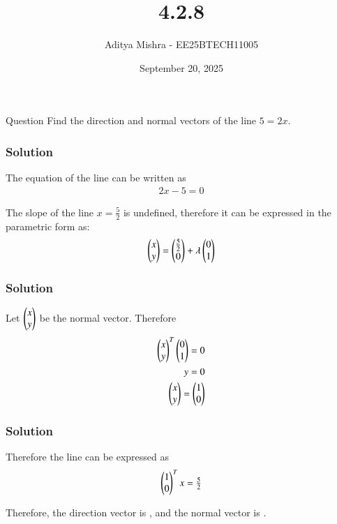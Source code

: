 \documentclass{beamer}
\title
{4.2.8}
\date{September 20, 2025}
\author
{Aditya Mishra - EE25BTECH11005}
\begin{document}
\frame{\titlepage}

\begin{frame}{Question}
Find the direction and normal vectors of the line $5 = 2x$.
\end{frame}

\begin{frame}[fragile]
    \frametitle{Solution}
The equation of the line can be written as
\begin{align}
2x - 5 = 0
\end{align}

The slope of the line $x = \frac{5}{2}$ is undefined, therefore it can be expressed in the parametric form as:
\begin{align}
\begin{pmatrix}x\\y\end{pmatrix} = \begin{pmatrix}\tfrac{5}{2}\\0\end{pmatrix} + \lambda\begin{pmatrix}0\\1\end{pmatrix}
\end{align}
\end{frame}

\begin{frame}[fragile]
    \frametitle{Solution}
Let $\begin{pmatrix}x\\y\end{pmatrix}$ be the normal vector. Therefore
\begin{align}
\begin{pmatrix}x\\ y\end{pmatrix}^T\begin{pmatrix}0\\1\end{pmatrix} = 0 \\
y = 0\\
\begin{pmatrix}x\\y\end{pmatrix} = \begin{pmatrix}1\\0\end{pmatrix}
\end{align}
\end{frame}

\begin{frame}[fragile]
    \frametitle{Solution}
Therefore the line can be expressed as
\begin{align}
\begin{pmatrix}1\\0\end{pmatrix}^Tx = \tfrac{5}{2}
\end{align}

\vspace{1cm}

Therefore, the direction vector is , and the normal vector is .
\end{frame}
\end{document}
